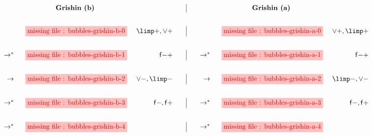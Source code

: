 \setlength{\fboxsep}{2pt}
\setlength{\arraycolsep}{0pt}
\newcommand{\vsp}{\vspace{2em}}
$$
\begin{array}[t]{rcr@{\qquad}|@{\qquad}rcr@{\vsp}}
       &\text{\textbf{Grishin (b)}} &&
       &\text{\textbf{Grishin (a)}} & \\

       &\stkfig{1}{bubbles-grishin-b-0} &{\limp}{+}, {\lor}{+} &
       &\stkfig{1}{bubbles-grishin-a-0} &{\lor}{+}, {\limp}{+} \\

\steps &\stkfig{1}{bubbles-grishin-b-1} &{\mathsf{f{-}{+}}} &
\steps &\stkfig{1}{bubbles-grishin-a-1} &{\mathsf{f{-}{+}}} \\

\step  &\stkfig{1}{bubbles-grishin-b-2} &{\lor}{-}, {\limp}{-} &
\step  &\stkfig{1}{bubbles-grishin-a-2} &{\limp}{-}, {\lor}{-} \\

\steps &\stkfig{1}{bubbles-grishin-b-3} &\mathsf{f{-}}, \mathsf{f{+}} &
\steps &\stkfig{1}{bubbles-grishin-a-3} &\mathsf{f{-}}, \mathsf{f{+}} \\

\steps &\stkfig{1}{bubbles-grishin-b-4} & &
\steps &\stkfig{1}{bubbles-grishin-a-4} &
\end{array}
$$
